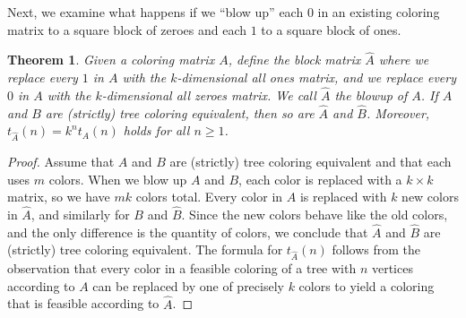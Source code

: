 \documentclass[12pt]{amsart}
\newtheorem{theorem}{Theorem}
\begin{document}
Next, we examine what happens if we ``blow up'' each $0$ in an existing coloring matrix to a square block of zeroes and each $1$ to a square block of ones.

\begin{theorem}\label{prop:blowup}
    Given a coloring matrix $A$, define the block matrix $\widehat{A}$ where we replace every $1$ in $A$ with the $k$-dimensional all ones matrix, and we replace every $0$ in $A$ with the $k$-dimensional all zeroes matrix.
    We call $\widehat{A}$ the \emph{blowup} of $A$.
    If $A$ and $B$ are (strictly) tree coloring equivalent, then so are $\widehat{A}$ and $\widehat{B}$. Moreover, $t_{\widehat{A}}(n) = k^n t_A(n)$ holds for all $n \geq 1$.
\end{theorem}
\begin{proof}
    Assume that $A$ and $B$ are (strictly) tree coloring equivalent and that each uses $m$ colors.
    When we blow up $A$ and $B$, each color is replaced with a $k \times k$ matrix, so we have $mk$ colors total. 
    Every color in $A$ is replaced with $k$ new colors in $\widehat{A}$, and similarly for $B$ and $\widehat{B}$.
    Since the new colors 
    behave like the old colors, 
    and the only difference is the quantity of colors, we conclude that $\widehat{A}$ and $\widehat{B}$ are (strictly) tree coloring equivalent.
    The formula for $t_{\widehat{A}}(n)$ follows from the observation that every color in a feasible coloring of a tree with $n$ vertices according to $A$ can be replaced by one of precisely $k$ colors to yield a coloring that is feasible according to $\widehat{A}$.
\end{proof}
\end{document}
